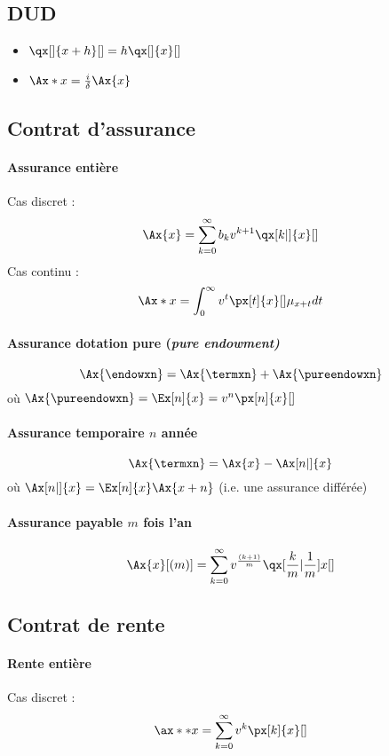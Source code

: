 \documentclass[10pt, french]{article}
\begin{document}
\begin{multicols*}{2}
\subsection*{DUD}
\begin{itemize}
\item $\qx[]{x+h}[] = h \qx[]{x}[]$
\item $\Ax*{x} = \frac{i}{\delta} \Ax{x}$
\end{itemize}



\subsection*{Contrat d'assurance}
\paragraph{Assurance entière}
Cas discret : 
\[\Ax{x} = \sum_{k=0}^{\infty} b_k v^{k+1} \qx[k|]{x}[]\]
Cas continu : 
\[\Ax*{x} = \int_{0}^{\infty} v^t \px[t]{x}[] \mu_{x+t} dt  \]

\paragraph{Assurance dotation pure (\emph{pure endowment)}}
\[\Ax{\endowxn} = \Ax{\termxn} + \Ax{\pureendowxn}\]
où $\Ax{\pureendowxn} = \Ex[n]{x} = v^n \px[n]{x}[]$

\paragraph{Assurance temporaire $n$ année}
\[\Ax{\termxn} = \Ax{x} - \Ax[n|]{x} \]
où $\Ax[n|]{x}  = \Ex[n]{x} \Ax{x+n}$ (i.e. une assurance différée)

\paragraph{Assurance payable $m$ fois l'an}
\[\Ax{x}[(m)] = \sum_{k=0}^{\infty} v^{\frac{(k+1)}{m}} \qx[\frac{k}{m} | \frac{1}{m}]{x}[] \]


\subsection*{Contrat de rente}
\paragraph{Rente entière} Cas discret : 
\[\ax**{x} = \sum_{k=0}^{\infty} v^{k} \px[k]{x}[]  \]


\end{multicols*}
\end{document}
